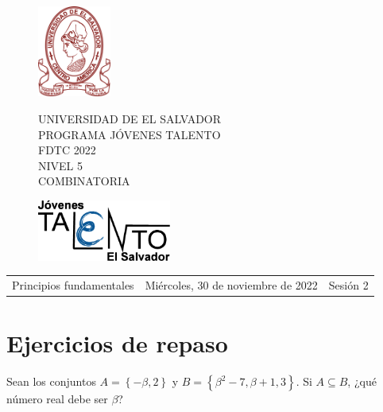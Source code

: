 \documentclass[12pt]{article}
\newcommand{\tema}{Principios fundamentales}
\newcommand{\fecha}{Miércoles, 30 de noviembre de 2022}
\newcommand{\sesion}{Sesión 2}
\begin{document}
\thispagestyle{empty}

\begin{figure}[h] 
	\begin{minipage}[b]{0.26\textwidth}
		\begin{center}
			\includegraphics[height=3cm]{Logos/UES.png}
			\par\end{center}
	\end{minipage} 
	\begin{minipage}[b]{0.46\textwidth}
		\begin{center}
			UNIVERSIDAD DE EL SALVADOR\\ [0.1cm]
			PROGRAMA JÓVENES TALENTO\\ [0.1cm]
	        FDTC 2022\\ [0.1cm]
                NIVEL 5\\ [0.1cm]
			COMBINATORIA 
			\par\end{center}
	\end{minipage} 
	\begin{minipage}[b]{0.05\textwidth}
		\begin{center}
			\includegraphics[height=2cm]{Logos/LOGO PJT.png}
			\par\end{center}
	\end{minipage}
\end{figure}

\begin{center}
    \begin{tabular}{p{4.5cm} p{7cm} p{4.5cm}}
        \tema & \centering\fecha & \hfill\sesion
    \end{tabular}
\end{center}
\section{Ejercicios de repaso}
\begin{ejercicio}
    Sean los conjuntos $A=\left\{-\beta,2\right\}$ y $B=\left\{\beta^2-7,\beta+1,3\right\}$. Si $A\subseteq B$, ¿qué número real debe ser $\beta$?
\end{ejercicio}
\end{document}
